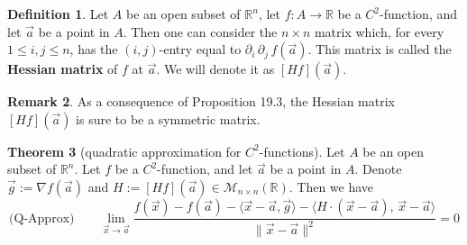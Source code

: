 \documentclass[11pt]{article}
\theoremstyle{definition}
\newtheorem{thm}{Theorem}[section]
\newtheorem{defn}[thm]{Definition}
\newtheorem{remark}[thm]{Remark}
\newcommand{\R}{\ensuremath{\mathbb{R}}}
\begin{document}
\begin{defn}
Let $A$ be an open subset of $\R^n$, let $f : A \to \R$ be a $C^2$-function, and let $\vec{a}$ be a point in $A$. Then one can consider the $n \times n$ matrix which, for every $1 \leq i, j \leq n$, has the $(i,j)$-entry equal to $\partial_i\,\partial_j\,f(\vec{a})$. This matrix is called the {\bf Hessian matrix} of $f$ at $\vec{a}$. We will denote it as $[Hf](\vec{a})$.
\end{defn}

\begin{remark}
As a consequence of Proposition 19.3, the Hessian matrix $[Hf](\vec{a})$ is sure to be a symmetric matrix.
\end{remark}

\begin{thm}[quadratic approximation for $C^2$-functions]
Let $A$ be an open subset of $\R^n$. Let $f$ be a $C^2$-function, and let $\vec{a}$ be a point in $A$. Denote $\vec{g} := \nabla f(\vec{a})$ and $H := [Hf](\vec{a}) \in \mathcal{M}_{n\times n}(\R)$. Then we have
$$\text{(Q-Approx)} \qquad \lim_{\vec{x}\to\vec{a}} \frac{f(\vec{x}) - f(\vec{a}) - \langle \vec{x} - \vec{a}, \vec{g} \rangle - \langle H \cdot (\vec{x} - \vec{a}),\, \vec{x} - \vec{a} \rangle}{\|\vec{x} - \vec{a}\|^2} = 0$$
\end{thm}
\end{document}
